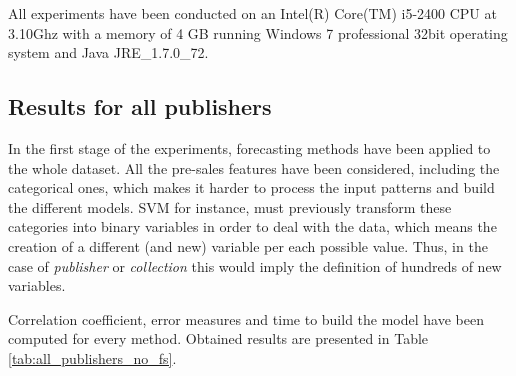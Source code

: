 \documentclass[a4paper,10pt,twocolumn,preprint,3p]{elsarticle}
\begin{document}
All experiments have been conducted on an  Intel(R) Core(TM) i5-2400 CPU at 3.10Ghz with a memory of 4 GB running Windows 7 professional 32bit operating system and Java JRE\_1.7.0\_72.



\subsection{Results for all publishers}
\label{subsec:results_all_publishers}

In the first stage of the experiments, forecasting methods have been
applied to the whole dataset. All the pre-sales features have been
considered, including the categorical ones, which makes it harder to
process the input patterns and build the different models. SVM for
instance, must previously transform these categories into binary
variables in order to deal with the data, which means the creation of
a different (and new) variable per each possible value. Thus, in the
case of \emph{publisher} or \emph{collection} this would imply the definition of
hundreds of new variables. 

Correlation coefficient, error measures and time to build the model have been computed for every method. Obtained results are presented in Table \ref{tab:all_publishers_no_fs}.

\begin{table*}
\caption{Predicting Total sales for all publishers (all the features). 30 repetitions, 10-fold cross validation. Best values in bold.
\label{tab:all_publishers_no_fs}}
\centering{}%
\end{table*}
\end{document}
